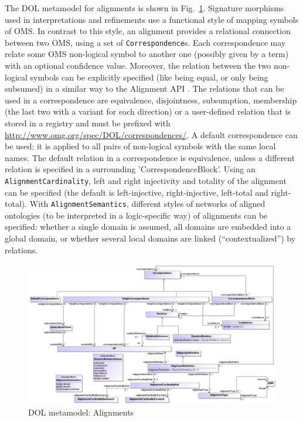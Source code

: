\documentclass[10pt,fleqn,final]{scrreprt}
\newcommand*{\termref}[1]{\index{#1}#1\xspace}
\newcommand*{\syntax}[1]{\texttt{#1}}
\newenvironment{definitions}[0]{\medskip }{}
\begin{document}
\begin{definitions}
The DOL metamodel for alignments is shown in 
Fig.~\ref{fig:alignment}.
Signature morphisms used in interpretations and refinements use
a functional style of mapping symbols of OMS.
In contrast to this style, an alignment provides a relational 
connection between two OMS,  using a set of \syntax{Correspondence}s. Each correspondence may relate 
some OMS non-logical symbol to another one (possibly given by a term) with an optional confidence 
value. Moreover, the relation between the two non-logical symbols can be explicitly
specified (like being equal, or only being subsumed) in a similar way to the Alignment API \cite{AlignmentAPI}. 
The relations that can be used in a correspondence are equivalence, disjointness, subsumption, membership (the last two with a
variant for each direction) or a user-defined relation that is stored in a registry and must be prefixed with
\url{http://www.omg.org/spec/DOL/correspondences/}.
A default correspondence can be used; it is applied to all pairs of non-logical symbols with 
the same local names. The default relation in a correspondence is equivalence, unless  a different 
relation is specified in a surrounding 
'CorrespondenceBlock'.
Using an \syntax{AlignmentCardinality}, left and right injectivity and totality of the
\termref{alignment} can be specified (the default is left-injective, right-injective, left-total  and right-total).
With \syntax{AlignmentSemantics}, different styles of networks of aligned ontologies (to be interpreted in 
a logic-specific way) of alignments can be specified: whether a single domain is assumed, all domains are embedded into a global domain,
or whether several local domains are linked (``contextualized'') by relations.

\begin{figure}
  \centering
    \includegraphics[scale=0.43]{mof/alignment.png}
  \caption{DOL metamodel: Alignments}
  \label{fig:alignment}
\end{figure}



\end{definitions}
\end{document}
